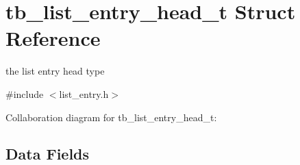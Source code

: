\hypertarget{structtb__list__entry__head__t}{\section{tb\-\_\-list\-\_\-entry\-\_\-head\-\_\-t Struct Reference}
\label{structtb__list__entry__head__t}
}


the list entry head type  




{\ttfamily \#include $<$list\-\_\-entry.\-h$>$}



Collaboration diagram for tb\-\_\-list\-\_\-entry\-\_\-head\-\_\-t\-:
\subsection*{Data Fields}
